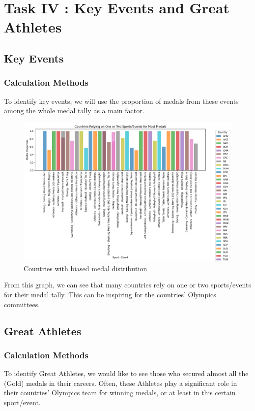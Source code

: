 \section{Task IV : Key Events and Great Athletes}
\subsection{Key Events}
\subsubsection{Calculation Methods}
To identify key events, we will use the proportion of medals from these events among the whole medal tally as a main factor.

\begin{figure}[htbp]
    \centering
    \includegraphics[width=1.1\textwidth]{./figures/Key_event.png}
    \caption{ Countries with biased medal distribution}
    \label{fig:Key_event}
\end{figure}

From this graph, we can see that many countries rely on one or two sports/events for their medal tally. This can be inspiring for the countries' Olympics committees.

\subsection{Great Athletes}
\subsubsection{Calculation Methods}
To identify Great Athletes, we would like to see those who secured almost all the (Gold) medals in their careers. Often, these Athletes play a significant role in their countries' Olympics team for
winning medals, or at least in this certain sport/event.

